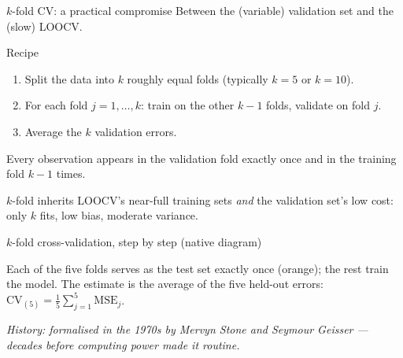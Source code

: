 \documentclass[aspectratio=169,11pt]{beamer}
\begin{document}
\begin{frame}{$k$-fold CV: a practical compromise}
  Between the (variable) validation set and the (slow) LOOCV.
  \begin{block}{Recipe}
    \begin{enumerate}
      \item Split the data into $k$ roughly equal folds (typically
            $k = 5$ or $k = 10$).
      \item For each fold $j = 1, \ldots, k$: train on the other
            $k - 1$ folds, validate on fold $j$.
      \item Average the $k$ validation errors.
    \end{enumerate}
  \end{block}
  Every observation appears in the validation fold exactly once and
  in the training fold $k - 1$ times.
  \begin{takeaway}
    $k$-fold inherits LOOCV's near-full training sets \emph{and} the
    validation set's low cost: only $k$ fits, low bias, moderate
    variance.
  \end{takeaway}
\end{frame}

\begin{frame}{$k$-fold cross-validation, step by step (native diagram)}
  \begin{center}
  \end{center}
  \begin{takeaway}
    Each of the five folds serves as the test set exactly once (orange); the rest train the model. The estimate is the average of the five held-out errors: $\mathrm{CV}_{(5)}=\tfrac15\sum_{j=1}^{5}\mathrm{MSE}_j$.
  \end{takeaway}
  \par{\tiny\itshape\color{gray}History: formalised in the 1970s by Mervyn
  Stone and Seymour Geisser --- decades before computing power made it
  routine.}
\end{frame}
\end{document}
